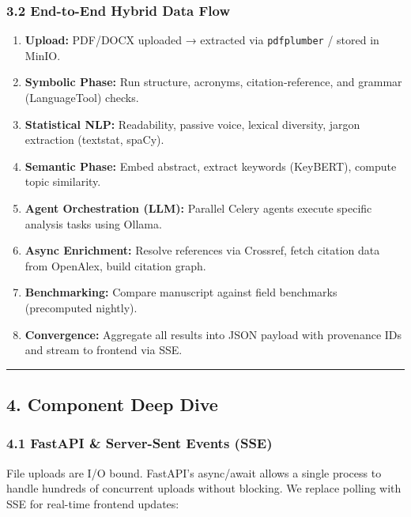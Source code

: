\documentclass[
]{article}
\providecommand{\tightlist}{%
  \setlength{\itemsep}{0pt}\setlength{\parskip}{0pt}}
\begin{document}
\subsubsection{3.2 End-to-End Hybrid Data
Flow}\label{end-to-end-hybrid-data-flow}

\begin{enumerate}
\def\labelenumi{\arabic{enumi}.}
\tightlist
\item
  \textbf{Upload:} PDF/DOCX uploaded → extracted via \texttt{pdfplumber}
  / stored in MinIO.
\item
  \textbf{Symbolic Phase:} Run structure, acronyms, citation‑reference,
  and grammar (LanguageTool) checks.
\item
  \textbf{Statistical NLP:} Readability, passive voice, lexical
  diversity, jargon extraction (textstat, spaCy).
\item
  \textbf{Semantic Phase:} Embed abstract, extract keywords (KeyBERT),
  compute topic similarity.
\item
  \textbf{Agent Orchestration (LLM):} Parallel Celery agents execute
  specific analysis tasks using Ollama.
\item
  \textbf{Async Enrichment:} Resolve references via Crossref, fetch
  citation data from OpenAlex, build citation graph.
\item
  \textbf{Benchmarking:} Compare manuscript against field benchmarks
  (precomputed nightly).
\item
  \textbf{Convergence:} Aggregate all results into JSON payload with
  provenance IDs and stream to frontend via SSE.
\end{enumerate}

\begin{center}\rule{0.5\linewidth}{0.5pt}\end{center}

\subsection{4. Component Deep Dive}\label{component-deep-dive}

\subsubsection{4.1 FastAPI \& Server-Sent Events
(SSE)}\label{fastapi-server-sent-events-sse}

File uploads are I/O bound. FastAPI's async/await allows a single
process to handle hundreds of concurrent uploads without blocking. We
replace polling with SSE for real-time frontend updates:
\end{document}

